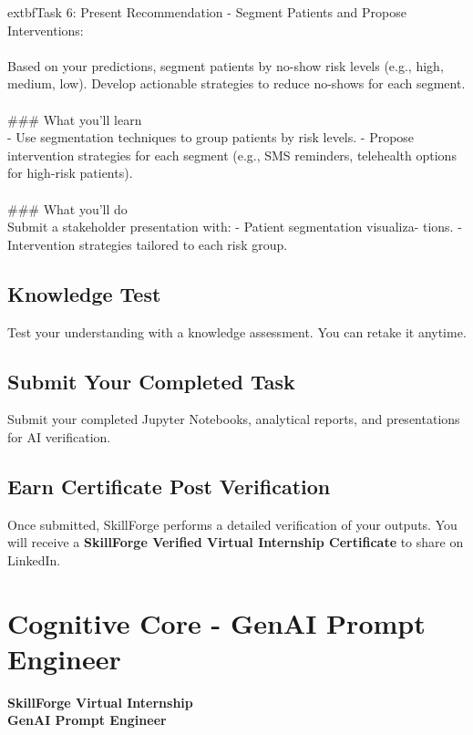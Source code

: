 \documentclass{article}
\begin{document}
	extbf{Task 6:} Present Recommendation - Segment Patients and Propose Interventions:  \\
 \\
 Based on your predictions, segment patients by no-show risk levels (e.g., high, medium, low). Develop actionable strategies to reduce no-shows for each segment. \\
 \\
### What you'll learn \\
- Use segmentation techniques to group patients by risk levels. - Propose intervention strategies for each segment (e.g., SMS reminders, telehealth options for high-risk patients). \\
 \\
### What you'll do \\
Submit a stakeholder presentation with: - Patient segmentation visualiza- tions. - Intervention strategies tailored to each risk group.

\subsection*{Knowledge Test}
Test your understanding with a knowledge assessment. You can retake it anytime.\\

\subsection*{Submit Your Completed Task}
Submit your completed Jupyter Notebooks, analytical reports, and presentations for AI verification.\\

\subsection*{Earn Certificate Post Verification}
Once submitted, SkillForge performs a detailed verification of your outputs. You will receive a \textbf{SkillForge Verified Virtual Internship Certificate} to share on LinkedIn.\\

\newpage

\section{Cognitive Core - GenAI Prompt Engineer}

\textbf{SkillForge Virtual Internship} \\
\textbf{GenAI Prompt Engineer} \\
\end{document}
